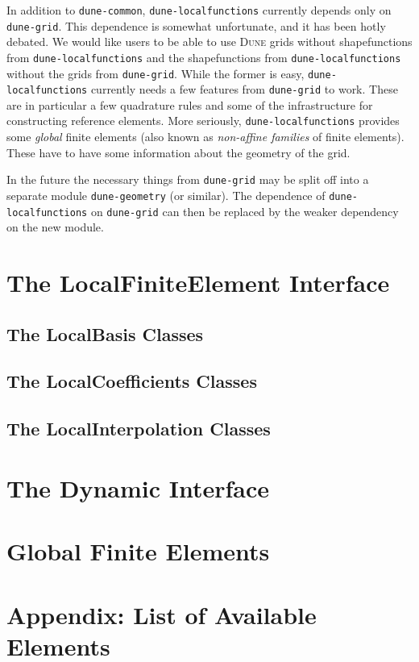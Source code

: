 \documentclass[11pt]{article}
\newcommand{\dune}{\textsc{Dune}\xspace}
\newcommand{\modulename}[1]{\texttt{#1}\xspace}
\begin{document}
In addition to \modulename{dune-common}, \modulename{dune-localfunctions} currently
depends only on \modulename{dune-grid}.  This dependence is somewhat unfortunate,
and it has been hotly debated.  We would like users to be able to use \dune grids
without shapefunctions from \modulename{dune-localfunctions} and the shapefunctions
from \modulename{dune-localfunctions} without the grids from \modulename{dune-grid}.
While the former is easy, \modulename{dune-localfunctions} currently needs a few
features from \modulename{dune-grid} to work.  These are in particular a few
quadrature rules and some of the infrastructure for constructing reference elements.
More seriously, \modulename{dune-localfunctions} provides some {\em global} finite
elements (also known as {\em non-affine families} of finite elements).  These
have to have some information about the geometry of the grid.

In the future the necessary things from \modulename{dune-grid} may be split off
into a separate module \modulename{dune-geometry} (or similar).  The dependence of
\modulename{dune-localfunctions} on \modulename{dune-grid} can then be replaced
by the weaker dependency on the new module.


\section{The LocalFiniteElement Interface}
\label{sec:static_interface}

\subsection{The LocalBasis Classes}

\subsection{The LocalCoefficients Classes}

\subsection{The LocalInterpolation Classes}


\section{The Dynamic Interface}
\label{sec:dynamic_interface}

\section{Global Finite Elements}


\section{Appendix: List of Available Elements}



%
%
\end{document}

